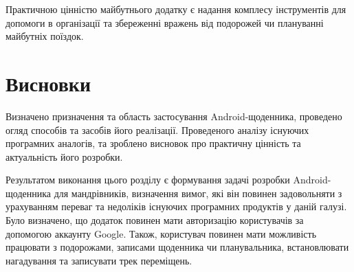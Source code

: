 \documentclass[../main.tex]{subfiles}
\begin{document}
Практичною цінністю майбутнього додатку є надання комплесу інструментів для допомоги в організації та збереженні вражень від подорожей чи плануванні майбутніх поїздок.

\section{Висновки}

Визначено призначення та область застосування Android-щоденника, проведено огляд способів та засобів його реалізації. Проведеного аналізу існуючих програмних аналогів, та зроблено висновок про практичну цінність та актуальність його розробки.

Результатом виконання цього розділу є формування задачі розробки Android-щоденника для мандрівників, визначення вимог, які він повинен задовольняти з урахуванням переваг та недоліків існуючих програмних продуктів у даній галузі. Було визначено, що додаток повинен мати авторизацію користувачів за допомогою аккаунту Google. Також, користувач повинен мати можливість працювати з подорожами, записами щоденника чи планувальника, встановлювати нагадування та записувати трек переміщень.

\end{document}
